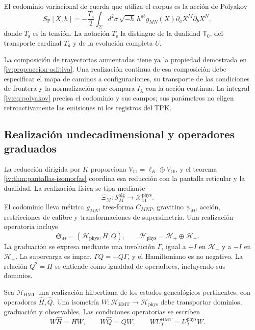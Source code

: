 El codominio variacional de cuerda que utiliza el corpus
es la acción de Polyakov
\begin{equation}
 S_{\mathrm P}[X,h]
 =-\frac{T_{\mathrm s}}2\int_\Sigma d^2\sigma\,
 \sqrt{-h}\,h^{ab}g_{MN}(X)
             \partial_aX^M\partial_bX^N,
 \label{iv:eq:polyakov}
\end{equation}
donde \(T_{\mathrm s}\) es la tensión. La notación
\(T_{\mathrm s}\) la distingue de la dualidad
\(\mathsf T_0\), del transporte cardinal \(T_d\)
y de la evolución completa \(U\).

La composición de trayectorias aumentadas tiene ya la
propiedad demostrada en \ref{iv:prop:accion-aditiva}.
Una realización continua de esa composición debe
especificar el mapa de caminos a configuraciones,
su transporte de las condiciones de frontera y la
normalización que compara \(I_\lambda\) con la acción
continua. La integral \eqref{iv:eq:polyakov} precisa
el codominio y sus campos; sus parámetros no eligen
retroactivamente las emisiones ni los registros del TPK.

\subsection{Realización undecadimensional y operadores graduados}

La reducción dirigida por \(K\) proporciona
\(V_{11}=\ell_K\oplus V_{10}\), y el teorema
\ref{iv:thm:pantallas-isomorfas} coordina esa reducción
con la pantalla reticular y la dualidad. La realización
física se tipa mediante
\[
 \Xi_M:\mathscr S_M^{\mathrm{alg}}
                  \longrightarrow\mathcal X_{11}^{\mathrm{phys}}.
\]
El codominio lleva métrica \(g_{MN}\), tres-forma
\(C_{MNP}\), gravitino \(\psi_M\), acción,
restricciones de calibre y transformaciones de
supersimetría. Una realización operatoria incluye
\[
 \mathfrak S_M=(\mathcal H_{\mathrm{phys}},H,Q),\qquad
 \mathcal H_{\mathrm{phys}}=\mathcal H_+\oplus\mathcal H_-.
\]
La graduación se expresa mediante una involución
\(\Gamma\), igual a \(+I\) en \(\mathcal H_+\)
y a \(-I\) en \(\mathcal H_-\). La supercarga
es impar, \(\Gamma Q=-Q\Gamma\), y el
Hamiltoniano es no negativo. La relación
\(Q^2=H\) se entiende como igualdad de operadores,
incluyendo sus dominios.

Sea \(\mathcal H_{\mathrm{HMT}}\) una realización
hilbertiana de los estados genealógicos pertinentes,
con operadores \(\widehat H,\widehat Q\). Una
isometría \(W:\mathcal H_{\mathrm{HMT}}\to
\mathcal H_{\mathrm{phys}}\) debe transportar
dominios, graduación y observables. Las condiciones
operatorias se escriben
\begin{equation}
 W\widehat H=HW,\qquad
 W\widehat Q=QW,\qquad
 WU_T^{\mathrm{HMT}}=U_T^{\mathrm{phys}}W.
 \label{iv:eq:entrelazamiento-fisico}
\end{equation}

